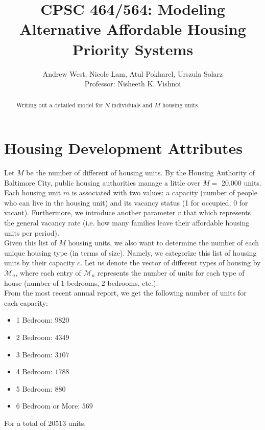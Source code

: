 \documentclass[11pt]{article}
\title{\bf CPSC 464/564: Modeling Alternative Affordable Housing Priority Systems}
\author{Andrew West, Nicole Lam, Atul Pokharel, Urszula Solarz \\
Professor: Nisheeth K. Vishnoi
}
\begin{document}
\maketitle
 
\begin{abstract}
Writing out a detailed model for $N$ individuals and $M$ housing units. 
\end{abstract}
\section{Housing Development Attributes}
Let $M$ be the number of different of housing units. By the Housing Authority of Baltimore City, public housing authorities manage a little over $M = $ 20,000 units. Each housing unit $m$ is associated with two values: a capacity (number of people who can live in the housing unit) and its vacancy status (1 for occupied, 0 for vacant). Furthermore, we introduce another parameter $v$ that which represents the general vacancy rate (i.e. how many families leave their affordable housing units per period). \\
\newline
Given this list of $M$ housing units, we also want to determine the number of each unique housing type (in terms of size). Namely, we categorize this list of housing units by their capacity $c$. Let us denote the vector of different types of housing by $\mathcal{M}_u$, where each entry of $\mathcal{M}_u$ represents the number of units for each type of house (number of 1 bedrooms, 2 bedrooms, etc.). \\
\newline
From the most recent annual report, we get the following number of units for each capacity:
\begin{itemize}
    \item 1 Bedroom: $9820$
    \item 2 Bedroom: $4349$
    \item 3 Bedroom: $3107$
    \item 4 Bedroom: $1788$
    \item 5 Bedroom: $880$
    \item 6 Bedroom or More: $569$ 
\end{itemize}
For a total of $20513$ units.
\end{document}
